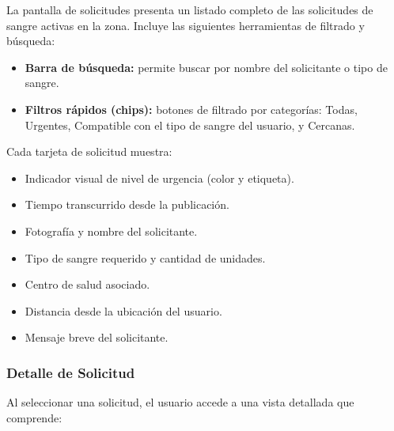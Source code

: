 \documentclass[12pt, a4paper]{article}
\begin{document}
La pantalla de solicitudes presenta un listado completo de las solicitudes de sangre activas en la zona. Incluye las siguientes herramientas de filtrado y búsqueda:

\begin{itemize}
    \item \textbf{Barra de búsqueda:} permite buscar por nombre del solicitante o tipo de sangre.
    \item \textbf{Filtros rápidos (chips):} botones de filtrado por categorías: Todas, Urgentes, Compatible con el tipo de sangre del usuario, y Cercanas.
\end{itemize}

Cada tarjeta de solicitud muestra:
\begin{itemize}
    \item Indicador visual de nivel de urgencia (color y etiqueta).
    \item Tiempo transcurrido desde la publicación.
    \item Fotografía y nombre del solicitante.
    \item Tipo de sangre requerido y cantidad de unidades.
    \item Centro de salud asociado.
    \item Distancia desde la ubicación del usuario.
    \item Mensaje breve del solicitante.
\end{itemize}

\subsubsection{Detalle de Solicitud}

Al seleccionar una solicitud, el usuario accede a una vista detallada que comprende:
\end{document}
